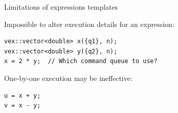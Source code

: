 \documentclass[@BEAMER_OPTIONS@]{beamer}
\begin{document}
\begin{frame}[fragile]{Limitations of expressions templates}
    \begin{exampleblock}{Impossible to alter execution details for an expression:}
        \begin{lstlisting}
vex::vector<double> x({q1}, n);
vex::vector<double> y({q2}, n);
x = 2 * y;  // Which command queue to use?
        \end{lstlisting}
    \end{exampleblock}
    \begin{exampleblock}{One-by-one execution may be ineffective:}
        \begin{lstlisting}
u = x + y;
v = x - y;
        \end{lstlisting}
    \end{exampleblock}
\end{frame}

\note{}
\end{document}
